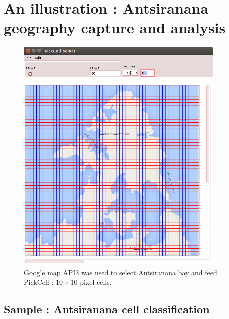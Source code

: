 \section {An illustration :  Antsiranana geography capture and analysis }

\begin{figure}[hbtp]
\begin{center} 
\includegraphics[width=10cm]{diego-split-10x10.png}
\caption{Google map API3 was used to select Antsiranana bay and feed PickCell : $10 \times 10$ pixel cells.}
\end{center}
\end{figure}

\subsection {Sample : Antsiranana  cell classification  }

